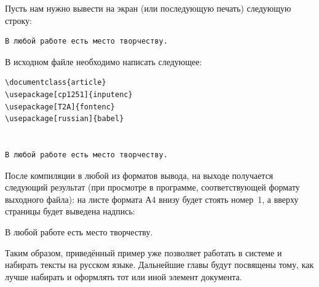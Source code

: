 Пусть нам нужно вывести на экран (или последующую печать) следующую строку:
\begin{verbatim}
В любой работе есть место творчеству.
\end{verbatim}

В исходном файле необходимо написать следующее:
\begin{verbatim}
\documentclass{article}
\usepackage[cp1251]{inputenc}
\usepackage[T2A]{fontenc}
\usepackage[russian]{babel}


В любой работе есть место творчеству.

\end{verbatim}

После компиляции в любой из форматов вывода, на выходе получается следующий результат (при просмотре в программе, соответствующей формату выходного файла): на листе формата А4 внизу будет стоять номер~1, а вверху страницы будет выведена надпись:
\medskip

В любой работе есть место творчеству.

\medskip

Таким образом, приведённый пример уже позволяет работать в системе и набирать тексты на русском языке. Дальнейшие главы будут посвящены тому, как лучше набирать и оформлять тот или иной элемент документа.


\endinput
%

